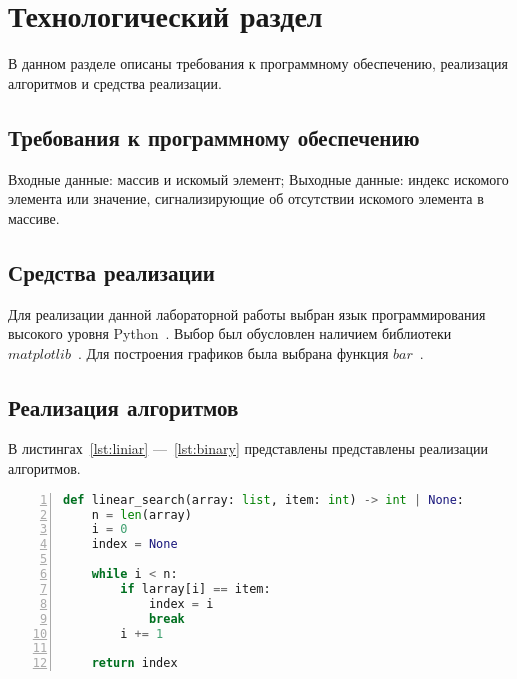 \chapter{Технологический раздел}

В данном разделе описаны требования к программному обеспечению, реализация алгоритмов и средства реализации.

\section{Требования к программному обеспечению}

Входные данные: массив и искомый элемент;
Выходные данные: индекс искомого элемента или значение, сигнализирующие об отсутствии искомого элемента в массиве.


\section{Средства реализации}
Для реализации данной лабораторной работы выбран язык программирования высокого уровня Python~\cite{python}. Выбор был обусловлен наличием библиотеки $matplotlib$~\cite{python_matplotlib}. Для построения графиков была выбрана функция $bar$~\cite{python_matplotlib_bar}.

\section{Реализация алгоритмов}
В листингах~\ref{lst:liniar} ---~\ref{lst:binary} представлены представлены реализации алгоритмов.

\begin{center}
\captionsetup{justification=raggedright,singlelinecheck=off}
\begin{lstlisting}[language=Python, frame=single, numbers=left, label=lst:liniar, caption=Реализация алгоритма линейного поиска]
def linear_search(array: list, item: int) -> int | None:
    n = len(array)
    i = 0
    index = None
    
    while i < n:
        if larray[i] == item:
            index = i
            break
        i += 1
        
    return index
\end{lstlisting}
\end{center}

\clearpage

